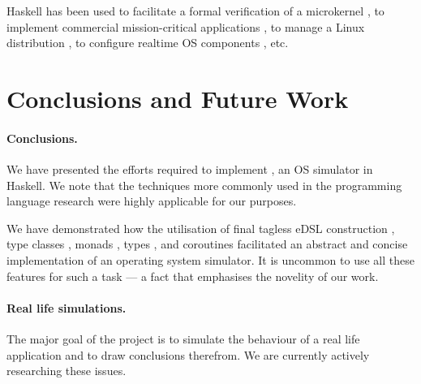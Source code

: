 Haskell has been used to facilitate a formal verification of a
microkernel \cite{Klein:2009:ERS:1631687.1596566}, to implement
commercial mission-critical applications
\cite{Sampson:2009:ERH:1631687.1596578}, to manage a Linux
distribution \cite{Beshers:2007:ERU:1291220.1291184}, to configure
realtime OS components \cite{Jones:2008:ERP:1411203.1411219}, etc.

\section{Conclusions and Future Work}
\label{sec:concl-future-work}

\paragraph{Conclusions.}
We have presented the efforts required to implement \soosim, an OS simulator in Haskell.
We note that the techniques more commonly used in the programming language research were highly applicable for our purposes.

We have demonstrated how the utilisation of final tagless eDSL construction \cite{final_tagless_embedding,Hofer:2008:PED:1449913.1449935}, type classes \cite{Hall:1996:TCH:227699.227700}, monads \cite{Wadler:1990:CM:91556.91592},  types \cite{Abadi:1991:DTS:103135.103138}, and coroutines \cite{coroutines,cmt} facilitated an abstract and concise implementation of an operating system simulator.
It is uncommon to use all these features for such a task --- a fact that emphasises the novelity of our work.

\paragraph{Real life simulations.}
The major goal of the project is to simulate the behaviour of a real life application and to draw conclusions therefrom.
We are currently actively researching these issues.

